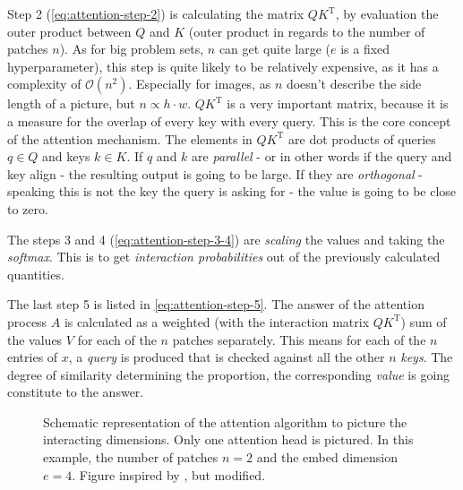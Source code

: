 Step 2 (\autoref{eq:attention-step-2}) is calculating the matrix $QK^\mathrm{T}$, by evaluation the \glqq outer product\grqq{} between $Q$ and $K$ (outer product in regards to the number of patches $n$).
As for big problem sets, $n$ can get quite large ($e$ is a fixed hyperparameter), this step is quite likely to be relatively expensive, as it has a complexity of $\mathcal{O}(n^2)$.
Especially for images, as $n$ doesn't describe the side length of a picture, but $n \propto h \cdot w$.
$QK^\mathrm{T}$ is a very important matrix, because it is a measure for the \glqq overlap\grqq{} of every key with every query. 
This is the core concept of the attention mechanism. 
The elements in $QK^\mathrm{T}$ are dot products of queries $q \in Q$ and keys $k \in K$. If $q$ and $k$ are \emph{parallel} - or in other words if the query and key align - the resulting output is going to be large.
If they are \emph{orthogonal} - speaking this is not the key the query is asking for - the value is going to be close to zero.

The steps 3 and 4 (\autoref{eq:attention-step-3-4}) are \emph{scaling} the values and taking the \emph{softmax}. 
This is to get \emph{interaction probabilities} out of the previously calculated quantities.

The last step 5 is listed in \autoref{eq:attention-step-5}.
The answer of the attention process $A$ is calculated as a weighted (with the interaction matrix $QK^\mathrm{T}$) sum of the values $V$ for each of the $n$ patches separately. 
This means for each of the $n$ entries of $x$, a \emph{query} is produced that is checked against all the other $n$ \emph{keys}. 
The degree of similarity determining the proportion, the corresponding \emph{value} is going constitute to the answer.

\begin{figure}[htbp]
    \centering
    \caption{Schematic representation of the attention algorithm to picture the interacting dimensions.
            Only one attention head is pictured.
            In this example, the number of patches $n=2$ and the embed dimension $e=4$.
            Figure inspired by \cite{attentionVisualizationDimensionality}, but modified.
            }
    \label{fig:attention-visualization}
\end{figure}

